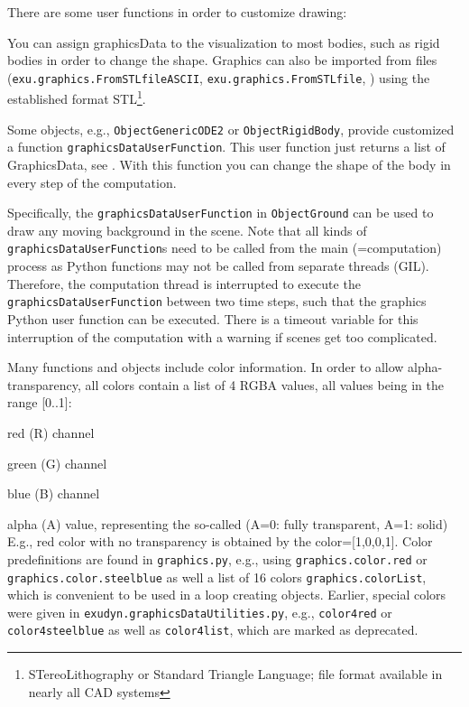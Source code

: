 There are some user functions in order to customize drawing:
\bi
  \item You can assign graphicsData to the visualization to most bodies, such as rigid bodies in order to change the shape. Graphics can also be imported from files (\texttt{exu.graphics.FromSTLfileASCII}, \texttt{exu.graphics.FromSTLfile}, ) using the established format \ac{STL}\footnote{STereoLithography or Standard Triangle Language; file format available in nearly all CAD systems}.
  \item Some objects, e.g., \texttt{ObjectGenericODE2} or \texttt{ObjectRigidBody}, provide customized a function \texttt{graphicsDataUserFunction}. This user function just returns a list of GraphicsData, see . With this function you can change the shape of the body in every step of the computation.
  \item Specifically, the \texttt{graphicsDataUserFunction} in \texttt{ObjectGround} can be used to draw any moving background in the scene.
\ei
Note that all kinds of \texttt{graphicsDataUserFunction}s need to be called from the main (=computation) process as Python functions may not be called from separate threads (GIL). Therefore, the computation thread is interrupted to execute the \texttt{graphicsDataUserFunction} between two time steps, such that the graphics Python user function can be executed. There is a timeout variable for this interruption of the computation with a warning if scenes get too complicated.

Many functions and objects include color information. In order to allow alpha-transparency, all colors contain a list of 4 RGBA values, all values being in the range [0..1]:
\bi
  \item red (R) channel 
  \item green (G) channel  
  \item blue (B) channel 
  \item alpha (A) value, representing the so-called  (A=0: fully transparent, A=1: solid)
\ei
E.g., red color with no transparency is obtained by the color=[1,0,0,1]. 
Color predefinitions are found in \texttt{graphics.py}, e.g., using \texttt{graphics.color.red} or \texttt{graphics.color.steelblue} as well a list of 16 colors \texttt{graphics.colorList}, which is convenient to be used in a loop creating objects.
Earlier, special colors were given in \texttt{exudyn.graphicsDataUtilities.py}, e.g., \texttt{color4red} or \texttt{color4steelblue} as well as \texttt{color4list}, which are marked as deprecated.

